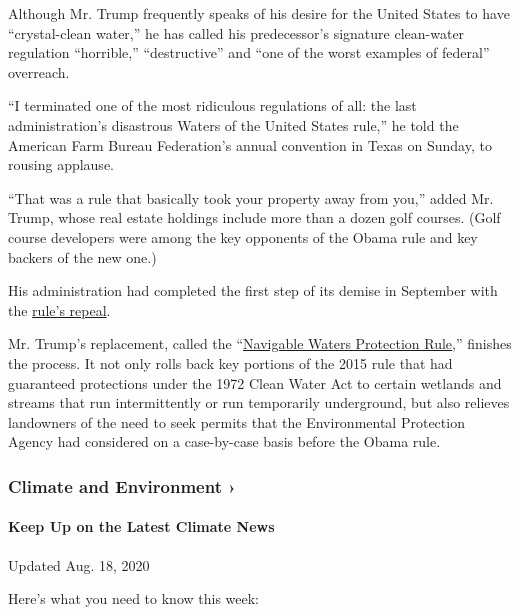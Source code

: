 Although Mr. Trump frequently speaks of his desire for the United States
to have ``crystal-clean water,'' he has called his predecessor's
signature clean-water regulation ``horrible,'' ``destructive'' and ``one
of the worst examples of federal'' overreach.

``I terminated one of the most ridiculous regulations of all: the last
administration's disastrous Waters of the United States rule,'' he told
the American Farm Bureau Federation's annual convention in Texas on
Sunday, to rousing applause.

``That was a rule that basically took your property away from you,''
added Mr. Trump, whose real estate holdings include more than a dozen
golf courses. (Golf course developers were among the key opponents of
the Obama rule and key backers of the new one.)

His administration had completed the first step of its demise in
September with the
\href{https://www.nytimes3xbfgragh.onion/2019/09/12/climate/trump-administration-rolls-back-clean-water-protections.html}{rule's
repeal}.

Mr. Trump's replacement, called the
``\href{https://www.epa.gov/nwpr}{Navigable Waters Protection Rule},''
finishes the process. It not only rolls back key portions of the 2015
rule that had guaranteed protections under the 1972 Clean Water Act to
certain wetlands and streams that run intermittently or run temporarily
underground, but also relieves landowners of the need to seek permits
that the Environmental Protection Agency had considered on a
case-by-case basis before the Obama rule.

\href{https://www.nytimes3xbfgragh.onion/section/climate?action=click\&pgtype=Article\&state=default\&region=MAIN_CONTENT_1\&context=storylines_keepup}{}

\hypertarget{climate-and-environment-}{%
\subsubsection{Climate and Environment
›}\label{climate-and-environment-}}

\hypertarget{keep-up-on-the-latest-climate-news}{%
\paragraph{Keep Up on the Latest Climate
News}\label{keep-up-on-the-latest-climate-news}}

Updated Aug. 18, 2020

Here's what you need to know this week:


